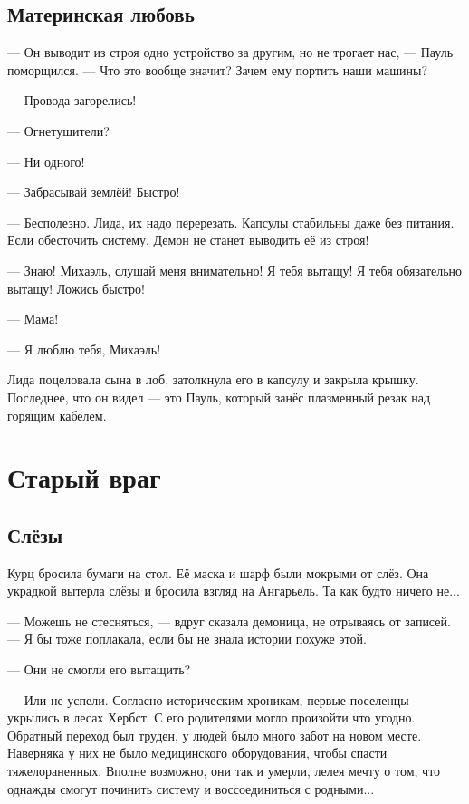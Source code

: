 \section{Материнская любовь}

--- Он выводит из строя одно устройство за другим, но не трогает нас, --- Пауль поморщился.
--- Что это вообще значит?
Зачем ему портить наши машины?

\asterism

--- Провода загорелись!

--- Огнетушители?

--- Ни одного!

--- Забрасывай землёй!
Быстро!

--- Бесполезно.
Лида, их надо перерезать.
Капсулы стабильны даже без питания.
Если обесточить систему, Демон не станет выводить её из строя!

--- Знаю!
Михаэль, слушай меня внимательно!
Я тебя вытащу!
Я тебя обязательно вытащу!
Ложись быстро!

--- Мама!

--- Я люблю тебя, Михаэль!

Лида поцеловала сына в лоб, затолкнула его в капсулу и закрыла крышку.
Последнее, что он видел --- это Пауль, который занёс плазменный резак над горящим кабелем.

\chapter{Старый враг}

\section{Слёзы}

Курц бросила бумаги на стол.
Её маска и шарф были мокрыми от слёз.
Она украдкой вытерла слёзы и бросила взгляд на Ангарьель.
Та как будто ничего не...

--- Можешь не стесняться, --- вдруг сказала демоница, не отрываясь от записей.
--- Я бы тоже поплакала, если бы не знала истории похуже этой.

--- Они не смогли его вытащить?

--- Или не успели.
Согласно историческим хроникам, первые поселенцы укрылись в лесах Хербст.
С его родителями могло произойти что угодно.
Обратный переход был труден, у людей было много забот на новом месте.
Наверняка у них не было медицинского оборудования, чтобы спасти тяжелораненных.
Вполне возможно, они так и умерли, лелея мечту о том, что однажды смогут починить систему и воссоединиться с родными...

